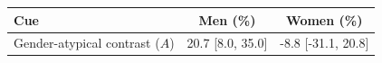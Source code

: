 \begin{tabular}{lcc}
\toprule
Cue & Men (\%) & Women (\%) \\
\midrule
Gender-atypical contrast ($A$) & 20.7 [8.0, 35.0] & -8.8 [-31.1, 20.8] \\
\bottomrule
\end{tabular}
